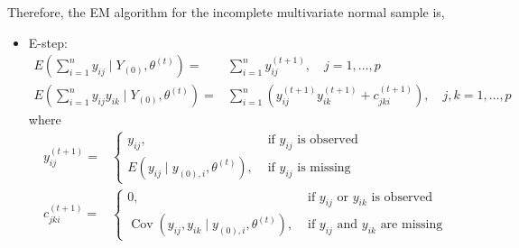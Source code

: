 \begin{example}
	Therefore, the EM algorithm for the incomplete multivariate normal sample is,
	\begin{itemize}
		\item E-step:
		      \begin{equation}
			      \begin{aligned}
				      E\left(\sum_{i=1}^{n} y_{i j} \mid Y_{(0)}, \theta^{(t)}\right)=         & \sum_{i=1}^{n} y_{i j}^{(t+1)}, \quad j=1, \ldots, p                                                  \\
				      E\left(\sum_{i=1}^{n} y_{i j} y_{i k} \mid Y_{(0)}, \theta^{(t)}\right)= & \sum_{i=1}^{n}\left(y_{i j}^{(t+1)} y_{i k}^{(t+1)}+c_{j k i}^{(t+1)}\right), \quad j, k=1, \ldots, p
			      \end{aligned}
		      \end{equation}
		      where
		      \begin{equation}
			      \begin{aligned}
				      y_{i j}^{(t+1)}=   & \left\{\begin{array}{ll}
					                                  y_{i j},                                             & \text { if } y_{i j} \text { is observed} \\
					                                  E\left(y_{i j} \mid y_{(0), i}, \theta^{(t)}\right), & \text { if } y_{i j} \text { is missing}
				                                  \end{array}\right.                                                                         \\
				      c_{j k i}^{(t+1)}= & \left\{\begin{array}{ll}
					                                  0,                                                                             & \text { if } y_{i j} \text { or } y_{i k} \text { is observed}  \\
					                                  \operatorname{Cov}\left(y_{i j}, y_{i k} \mid y_{(0), i}, \theta^{(t)}\right), & \text { if } y_{i j} \text { and } y_{i k} \text { are missing}
				                                  \end{array}\right.
			      \end{aligned}
		      \end{equation}


\end{itemize}
\end{example}
